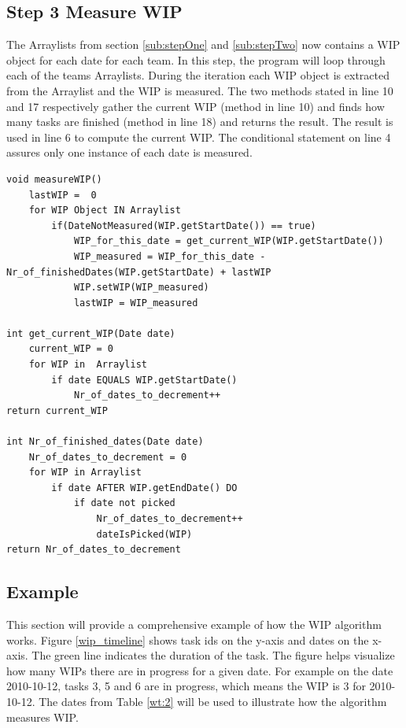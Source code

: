 \documentclass[UKenglish]{ifimaster}  %
\begin{document}
\subsection{Step 3 Measure WIP}
\vspace{-2.0em}
The Arraylists from section \ref{sub:stepOne}  and \ref{sub:stepTwo} now contains a WIP object for each date for each team. In this step, the program will loop through each of the teams Arraylists. During the iteration each WIP object is extracted from the Arraylist and the WIP is measured. The two methods stated in line 10 and 17 respectively gather the current WIP (method in line 10) and finds how many tasks are finished (method in line 18) and returns the result. The result is used in line 6 to compute the current WIP. The conditional statement on line 4 assures only one instance of each date is measured. 
\begin{minipage}{\textwidth} 
\begin{lstlisting}[caption={WIP measurement},label={lst:measure}]
void measureWIP()
	lastWIP =  0
	for WIP Object IN Arraylist	
		if(DateNotMeasured(WIP.getStartDate()) == true)
			WIP_for_this_date = get_current_WIP(WIP.getStartDate())  
			WIP_measured = WIP_for_this_date - Nr_of_finishedDates(WIP.getStartDate) + lastWIP
			WIP.setWIP(WIP_measured)
			lastWIP = WIP_measured 

int get_current_WIP(Date date)
	current_WIP = 0
	for WIP in  Arraylist
		if date EQUALS WIP.getStartDate()
			Nr_of_dates_to_decrement++
return current_WIP
			 	
int Nr_of_finished_dates(Date date)
	Nr_of_dates_to_decrement = 0
	for WIP in Arraylist
		if date AFTER WIP.getEndDate() DO
			if date not picked
				Nr_of_dates_to_decrement++
				dateIsPicked(WIP)				
return Nr_of_dates_to_decrement 
 \end{lstlisting}
  \end{minipage}

\subsection{Example}
\label{sec:Example}
This section will provide a comprehensive example of how the WIP algorithm works.  
Figure \ref{wip_timeline}  shows task ids on the y-axis and dates on the x-axis. The green line indicates the duration of the task. The figure helps  visualize how many WIPs there are in progress for a given date. For example on the date 2010-10-12, tasks 3, 5 and 6 are in progress, which means the WIP is 3 for 2010-10-12. The dates from Table \ref{wt:2}  will be used to illustrate how the algorithm measures WIP.
\end{document}
